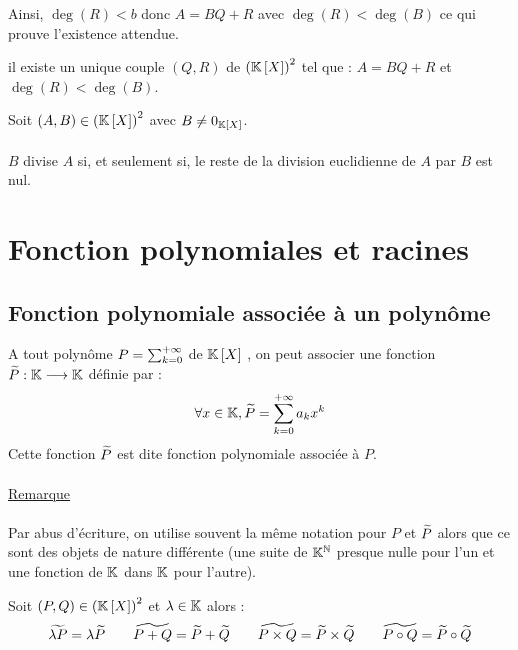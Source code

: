 \begin{dem}
\begin{itemize}
        Ainsi, \(\deg (R) < b\) donc \(A = BQ + R\) avec \(\deg(R) < \deg (B)\) ce qui prouve l’existence attendue.
    \end{itemize}
    \conclusion il existe un unique couple \((Q, R)\) de \(\left(\mathbb{K} \left[X\right]\right)^2\) tel que : \(A = BQ + R\) et \(\deg(R) < \deg(B)\).
\end{dem}

\begin{defprop}
    Soit \(\left(A,B\right) \in \left(\mathbb{K} \left[X\right]\right)^2 \) avec \(B\neq 0_{\mathbb{K}\left[X\right]}\).\\~\\
    \(B\) divise \(A\) si, et seulement si, le reste de la division euclidienne de \(A\) par \(B\) est nul.
\end{defprop}

\section{Fonction polynomiales et racines}
\subsection{Fonction polynomiale associée à un polynôme}
\begin{defi}
    A tout polynôme \(P= \sum_{k=0}^{+\infty}\) de \(\mathbb{K} \left[X\right]\) , on peut associer une fonction \(\widetilde{P} : \mathbb{K} \longrightarrow \mathbb{K}\) définie par :
    \[ \forall x \in \mathbb{K}, \widetilde{P} = \sum_{k=0}^{+\infty} a_k x^k\]
    Cette fonction \(\widetilde{P}\) est dite fonction polynomiale associée à \(P\).\\~\\
    \underline{Remarque}\\~\\
    Par abus d’écriture, on utilise souvent la même notation pour \(P\) et \(\widetilde{P}\) alors que ce sont des objets de nature différente (une suite de \(\mathbb{K}^{\mathbb{N}}\) presque nulle pour l’un et une fonction de \(\mathbb{K}\) dans \(\mathbb{K}\) pour l’autre).
\end{defi}

\begin{prop}
        Soit \(\left(P,Q\right) \in \left(\mathbb{K} \left[X\right]\right)^2 \) et \(\lambda \in \mathbb{K}\) alors : 
        \[ \widetilde{\lambda P} = \lambda \widetilde{P} \qquad \widetilde{P +Q} = \widetilde{P} + \widetilde{Q} \qquad \widetilde{P \times Q} = \widetilde{P} \times \widetilde{Q} \qquad \widetilde{P \circ Q} = \widetilde{P} \circ \widetilde{Q}\]
\end{prop}

